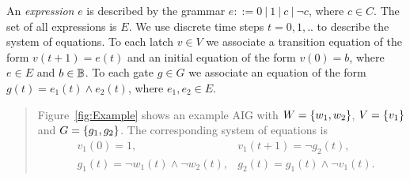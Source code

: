 {An \emph{expression} $e$ is described by the grammar $e::= 0\ |\ 1\ |\ c\ |\ \lnot c$, where $c \in C$. The set of all expressions is $E$. We use discrete time steps $t=0,1,..$ to describe the system of equations. To each latch $v\in V$ we associate a transition {equation} of the form $v(t+1) = e(t)$ and an initial equation of the form $v(0)=b$, where $e\in E$ and $b\in \mathbb{B}$. To each gate $g\in G$ we associate an equation of the form $g(t)=e_1(t)\land e_2(t)$, where $e_1,e_2\in E$. 

\begin{quote}
\begin{example}
\label{ex:simple}
Figure~\ref{fig:Example} shows an example AIG with $W=\left\{w_1,w_2\right\}$, $V=\left\{v_1\right\}$ and $G=\left\{g_1,g_2\right\}$. The corresponding system of equations is
\begin{align*}
&v_1(0)=1, & v_1(t+1)=\lnot g_2(t),\\
&g_1(t)=\lnot w_1(t) \land \lnot w_2(t), & g_2(t)=g_1(t) \land \lnot v_1(t).
\end{align*}


\end{example}
\end{quote}}
